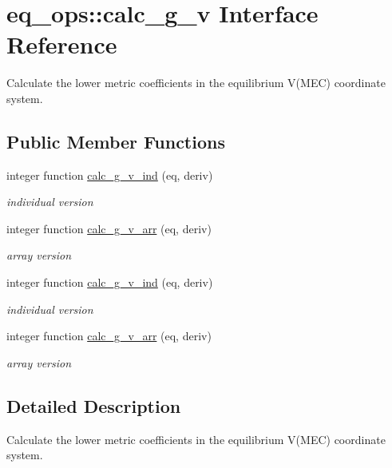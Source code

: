 \hypertarget{interfaceeq__ops_1_1calc__g__v}{}\section{eq\+\_\+ops\+:\+:calc\+\_\+g\+\_\+v Interface Reference}
\label{interfaceeq__ops_1_1calc__g__v}


Calculate the lower metric coefficients in the equilibrium V(\+M\+E\+C) coordinate system.  


\subsection*{Public Member Functions}
\begin{DoxyCompactItemize}
\item 
integer function \hyperlink{interfaceeq__ops_1_1calc__g__v_a16fcebfd6f70491ec6d66534cd50c7a4}{calc\+\_\+g\+\_\+v\+\_\+ind} (eq, deriv)
\begin{DoxyCompactList}\small\item\em individual version \end{DoxyCompactList}\item 
integer function \hyperlink{interfaceeq__ops_1_1calc__g__v_a7657be969a8a4627c65bbac534d89771}{calc\+\_\+g\+\_\+v\+\_\+arr} (eq, deriv)
\begin{DoxyCompactList}\small\item\em array version \end{DoxyCompactList}\item 
integer function \hyperlink{interfaceeq__ops_1_1calc__g__v_a16fcebfd6f70491ec6d66534cd50c7a4}{calc\+\_\+g\+\_\+v\+\_\+ind} (eq, deriv)
\begin{DoxyCompactList}\small\item\em individual version \end{DoxyCompactList}\item 
integer function \hyperlink{interfaceeq__ops_1_1calc__g__v_a7657be969a8a4627c65bbac534d89771}{calc\+\_\+g\+\_\+v\+\_\+arr} (eq, deriv)
\begin{DoxyCompactList}\small\item\em array version \end{DoxyCompactList}\end{DoxyCompactItemize}


\subsection{Detailed Description}
Calculate the lower metric coefficients in the equilibrium V(\+M\+E\+C) coordinate system. 

